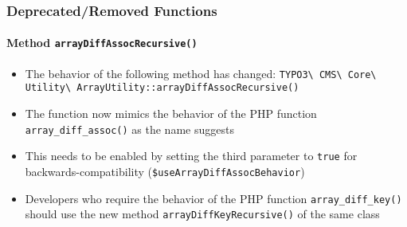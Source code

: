 %

\begin{frame}[fragile]
	\frametitle{Deprecated/Removed Functions}
	\framesubtitle{Method \texttt{arrayDiffAssocRecursive()}}

	\begin{itemize}
		\item The behavior of the following method has changed:\newline
			\smaller\texttt{TYPO3\textbackslash
				CMS\textbackslash
				Core\textbackslash
				Utility\textbackslash
				ArrayUtility::arrayDiffAssocRecursive()}\normalsize
		\item The function now mimics the behavior of the PHP function
			\texttt{array\_diff\_assoc()} as the name suggests
		\item This needs to be enabled by setting the third parameter to
			\texttt{true} for backwards-compatibility
			(\texttt{\$useArrayDiffAssocBehavior})
		\item Developers who require the behavior of the PHP function
			\texttt{array\_diff\_key()} should use the new method
			\texttt{arrayDiffKeyRecursive()} of the same class
	\end{itemize}

\end{frame}

